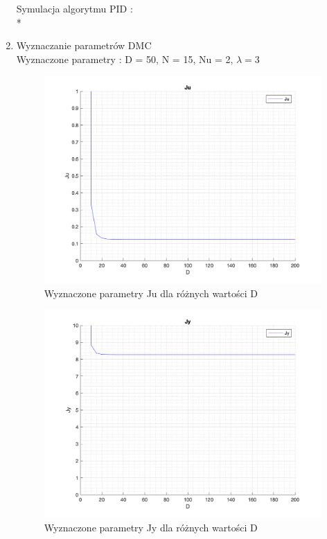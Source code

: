\documentclass[a4paper, 11pt]{article}
\begin{document}
\begin{enumerate}
Symulacja algorytmu PID : \\*
  
\newpage
\item
Wyznaczanie parametrów DMC \\
Wyznaczone parametry :   D = 50, N = 15, Nu = 2, \(\lambda = 3 \)\\
\begin{figure} [h]
\centering
 \includegraphics[width=\linewidth]{./ModelsP4_J/JuD.png} 
 \caption[Wyznaczone parametry Ju dla różnych wartości D]
{Wyznaczone parametry Ju dla różnych wartości D}
 \end{figure}
 
 \begin{figure} [h]
\centering
 \includegraphics[width=\linewidth]{./ModelsP4_J/JyD.png} 
 \caption[Wyznaczone parametry Jy dla różnych wartości D]
{Wyznaczone parametry Jy dla różnych wartości D}
 \end{figure}
 

\end{enumerate}
\end{document}
